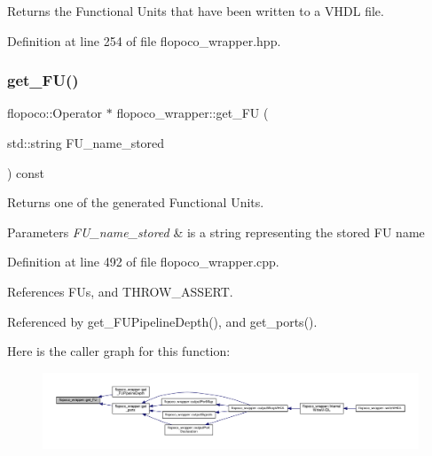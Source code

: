 Returns the Functional Units that have been written to a V\+H\+DL file. 



Definition at line 254 of file flopoco\+\_\+wrapper.\+hpp.

\mbox{\label{classflopoco__wrapper_ab45f79d64c8bd0e1d73dc7833a6d15ad}} 
\subsubsection{\texorpdfstring{get\+\_\+\+F\+U()}{get\_FU()}}
{\footnotesize\ttfamily flopoco\+::\+Operator $\ast$ flopoco\+\_\+wrapper\+::get\+\_\+\+FU (\begin{DoxyParamCaption}\item[{std\+::string}]{F\+U\+\_\+name\+\_\+stored }\end{DoxyParamCaption}) const\hspace{0.3cm}{\ttfamily [private]}}



Returns one of the generated Functional Units. 


\begin{DoxyParams}{Parameters}
{\em F\+U\+\_\+name\+\_\+stored} & is a string representing the stored FU name \\
\hline
\end{DoxyParams}


Definition at line 492 of file flopoco\+\_\+wrapper.\+cpp.



References F\+Us, and T\+H\+R\+O\+W\+\_\+\+A\+S\+S\+E\+RT.



Referenced by get\+\_\+\+F\+U\+Pipeline\+Depth(), and get\+\_\+ports().

Here is the caller graph for this function\+:
\nopagebreak
\begin{figure}[H]
\begin{center}
\leavevmode
\includegraphics[width=350pt]{d7/dbf/classflopoco__wrapper_ab45f79d64c8bd0e1d73dc7833a6d15ad_icgraph}
\end{center}
\end{figure}
\mbox{\label{classflopoco__wrapper_a0d439a47ce9842523b91cd5763bd5fe1}} 
